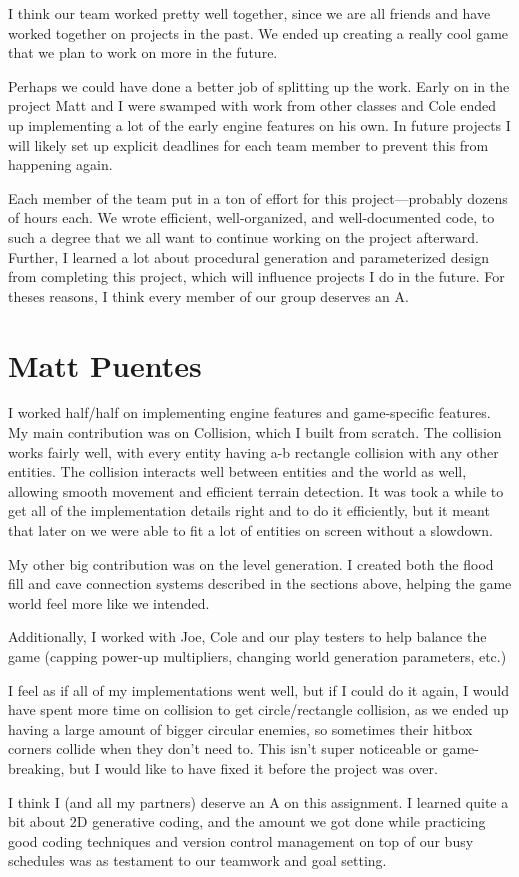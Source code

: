 \documentclass[a4paper, 12pt]{article}
\begin{document}
I think our team worked pretty well together, since we are all friends and have
worked together on projects in the past. We ended up creating a really cool game
that we plan to work on more in the future.

Perhaps we could have done a better job of splitting up the work. Early on in
the project Matt and I were swamped with work from other classes and Cole ended
up implementing a lot of the early engine features on his own. In future
projects I will likely set up explicit deadlines for each team member to prevent
this from happening again.

Each member of the team put in a ton of effort for this project---probably
dozens of hours each. We wrote efficient, well-organized, and well-documented
code, to such a degree that we all want to continue working on the project
afterward. Further, I learned a lot about procedural generation and
parameterized design from completing this project, which will influence projects
I do in the future. For theses reasons, I think every member of our group
deserves an A.

\section{Matt Puentes}

I worked half/half on implementing engine features and game-specific features.
My main contribution was on Collision, which I built from scratch. The collision
works fairly well, with every entity having a-b rectangle collision with any
other entities. The collision interacts well between entities and the world as
well, allowing smooth movement and efficient terrain detection. It was took a
while to get all of the implementation details right and to do it efficiently, 
but it meant that later on we were able to fit a lot of entities on screen
without a slowdown.

My other big contribution was on the level generation. I created both the
flood fill and cave connection systems described in the sections above, helping
the game world feel more like we intended.

Additionally, I worked with Joe, Cole and our play testers to help balance the
game (capping power-up multipliers, changing world generation parameters, etc.)

I feel as if all of my implementations went well, but if I could do it again, I
would have spent more time on collision to get circle/rectangle collision, as we
ended up having a large amount of bigger circular enemies, so sometimes their
hitbox corners collide when they don't need to. This isn't super noticeable or
game-breaking, but I would like to have fixed it before the project was over.

I think I (and all my partners) deserve an A on this assignment. I learned quite
a bit about 2D generative coding, and the amount we got done while practicing
good coding techniques and version control management on top of our busy
schedules was as testament to our teamwork and goal setting.
\end{document}

